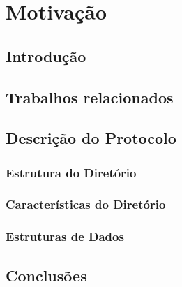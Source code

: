 
\chapter{Motivação}
\label{chap:estado-da-arte}

\section{Introdução}
\label{chap2:sec:intro}

\section{Trabalhos relacionados}


\section{Descrição do Protocolo}

\subsection{Estrutura do Diretório}

\subsection{Características do Diretório}

\subsection{Estruturas de Dados}

\section{Conclusões}
\label{chap2:sec:concs}
